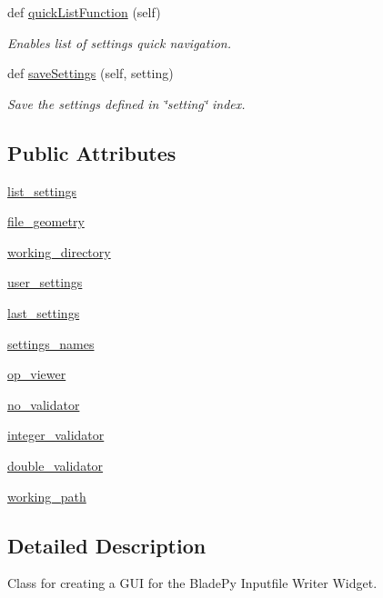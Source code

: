 \begin{DoxyCompactItemize}
def \hyperlink{a00070_a0e71786a8b6fe43e6a01ff388c34ce18}{quick\+List\+Function} (self)
\begin{DoxyCompactList}\small\item\em Enables list of settings quick navigation. \end{DoxyCompactList}\item 
def \hyperlink{a00070_a723573fade09f206a9c89569885558c1}{save\+Settings} (self, setting)
\begin{DoxyCompactList}\small\item\em Save the settings defined in \char`\"{}setting\char`\"{} index. \end{DoxyCompactList}\end{DoxyCompactItemize}
\subsection*{Public Attributes}
\begin{DoxyCompactItemize}
\item 
\hyperlink{a00070_ad019b7f076cb8b8b6820b6577d2058b6}{list\+\_\+settings}
\item 
\hyperlink{a00070_a17d54af05f4344118b082c2384a88bec}{file\+\_\+geometry}
\item 
\hyperlink{a00070_a267e018648a6f03f2bcc0a5b7c944f38}{working\+\_\+directory}
\item 
\hyperlink{a00070_a4f8dfa192201c6c945621ff197680200}{user\+\_\+settings}
\item 
\hyperlink{a00070_aa8731441bd4fdf801f74947c28d44ebf}{last\+\_\+settings}
\item 
\hyperlink{a00070_a3ce7139eaa5256714413efdb9f870eab}{settings\+\_\+names}
\item 
\hyperlink{a00070_af3daf3ca641b77de41d08750af03ef5e}{op\+\_\+viewer}
\item 
\hyperlink{a00070_aa6e2504eda6ac2ee99e37d4b5f862f57}{no\+\_\+validator}
\item 
\hyperlink{a00070_a33d2c6ecfa0800ef5eccfe0ce71475ee}{integer\+\_\+validator}
\item 
\hyperlink{a00070_a007df19a104366a8bb63a8ed11e0e5e4}{double\+\_\+validator}
\item 
\hyperlink{a00070_a2e8a633f45ef3a17852bc95deae51588}{working\+\_\+path}
\end{DoxyCompactItemize}


\subsection{Detailed Description}
Class for creating a G\+UI for the Blade\+Py Inputfile Writer Widget. 

